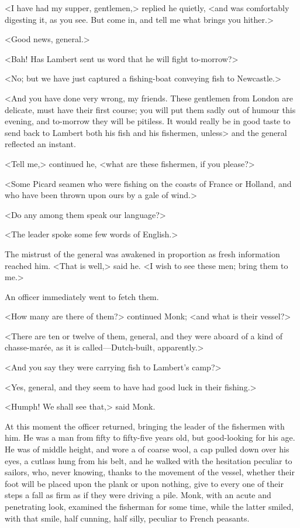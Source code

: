 <I have had my supper, gentlemen,> replied he quietly, <and was comfortably digesting it, as you see. But come in, and tell me what brings you hither.>

<Good news, general.>

<Bah! Has Lambert sent us word that he will fight to-morrow?>

<No; but we have just captured a fishing-boat conveying fish to Newcastle.>

<And you have done very wrong, my friends. These gentlemen from London are delicate, must have their first course; you will put them sadly out of humour this evening, and to-morrow they will be pitiless. It would really be in good taste to send back to Lambert both his fish and his fishermen, unless\longdash> and the general reflected an instant.

<Tell me,> continued he, <what are these fishermen, if you please?>

<Some Picard seamen who were fishing on the coasts of France or Holland, and who have been thrown upon ours by a gale of wind.>

<Do any among them speak our language?>

<The leader spoke some few words of English.>

The mistrust of the general was awakened in proportion as fresh information reached him. <That is well,> said he. <I wish to see these men; bring them to me.>

An officer immediately went to fetch them.

<How many are there of them?> continued Monk; <and what is their vessel?>

<There are ten or twelve of them, general, and they were aboard of a kind of chasse-marée, as it is called—Dutch-built, apparently.>

<And you say they were carrying fish to Lambert's camp?>

<Yes, general, and they seem to have had good luck in their fishing.>

<Humph! We shall see that,> said Monk.

At this moment the officer returned, bringing the leader of the fishermen with him. He was a man from fifty to fifty-five years old, but good-looking for his age. He was of middle height, and wore a  of coarse wool, a cap pulled down over his eyes, a cutlass hung from his belt, and he walked with the hesitation peculiar to sailors, who, never knowing, thanks to the movement of the vessel, whether their foot will be placed upon the plank or upon nothing, give to every one of their steps a fall as firm as if they were driving a pile. Monk, with an acute and penetrating look, examined the fisherman for some time, while the latter smiled, with that smile, half cunning, half silly, peculiar to French peasants.


